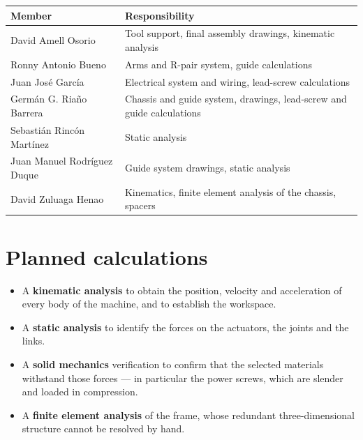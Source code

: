 \documentclass[11pt]{article}
\begin{document}
\begin{center}
\begin{tabular}{@{}l>{\raggedright\arraybackslash}p{9.4cm}@{}}
\toprule
\textbf{Member} & \textbf{Responsibility} \\
\midrule
David Amell Osorio        & Tool support, final assembly drawings, kinematic analysis \\
Ronny Antonio Bueno       & Arms and R-pair system, guide calculations \\
Juan Jos\'e Garc\'ia      & Electrical system and wiring, lead-screw calculations \\
Germ\'an G. Ria\~no Barrera & Chassis and guide system, drawings, lead-screw and guide calculations \\
Sebasti\'an Rinc\'on Mart\'inez & Static analysis \\
Juan Manuel Rodr\'iguez Duque   & Guide system drawings, static analysis \\
David Zuluaga Henao       & Kinematics, finite element analysis of the chassis, spacers \\
\bottomrule
\end{tabular}
\end{center}

\section{Planned calculations}

\begin{itemize}[leftmargin=*,nosep]
  \item A \textbf{kinematic analysis} to obtain the position, velocity and acceleration of
        every body of the machine, and to establish the workspace.
  \item A \textbf{static analysis} to identify the forces on the actuators, the joints and
        the links.
  \item A \textbf{solid mechanics} verification to confirm that the selected materials
        withstand those forces --- in particular the power screws, which are slender and
        loaded in compression.
  \item A \textbf{finite element analysis} of the frame, whose redundant three-dimensional
        structure cannot be resolved by hand.
\end{itemize}
\end{document}
